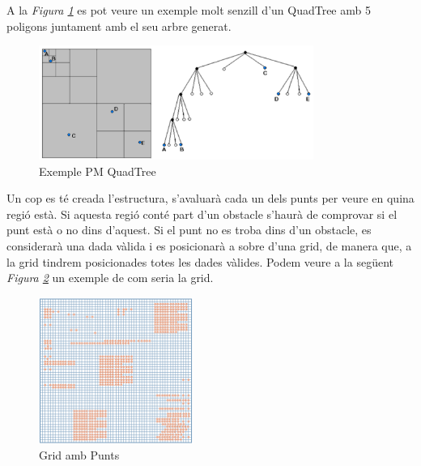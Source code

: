 \documentclass[12pt]{article}
\begin{document}
A la \textit{Figura \ref{fig:exemple_pm_quadtree}} es pot veure un exemple molt senzill d’un QuadTree amb 5 poligons juntament amb el seu arbre generat.

\begin{figure}[H]
	\centering
	\includegraphics[width=0.8\textwidth]{imatges/exemple_pm_quadtree.png}
	\caption{Exemple PM QuadTree}
	\label{fig:exemple_pm_quadtree}
\end{figure}





Un cop es té creada l'estructura, s'avaluarà cada un dels punts per veure en quina regió està. Si aquesta regió conté part d'un obstacle s'haurà de comprovar si el punt està o no dins d'aquest. Si el punt no es troba dins d'un obstacle, es considerarà una dada vàlida i es posicionarà a sobre d'una grid, de manera que, a la grid tindrem posicionades totes les dades vàlides. Podem veure a la següent \textit{Figura \ref{fig:grid_amb_punts}} un exemple de com seria la grid.

\begin{figure}[H]
	\centering
	\includegraphics[width=0.45\textwidth]{imatges/grid_amb_punts.png}
	\caption{Grid amb Punts}
	\label{fig:grid_amb_punts}
\end{figure}
\end{document}

